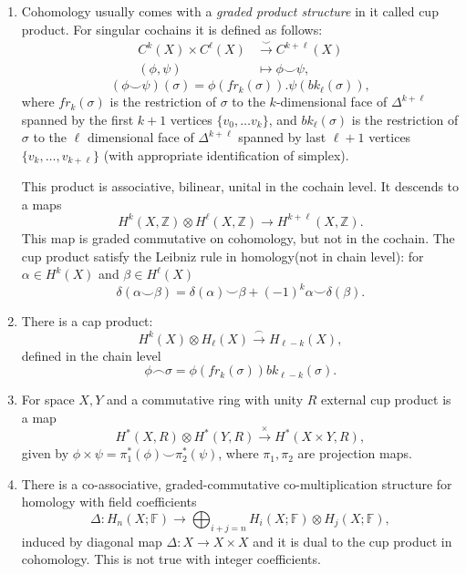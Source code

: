  	\begin{enumerate}
 		\item Cohomology usually comes with a \emph{graded product structure} in it called cup product.
 		For singular cochains it is defined as follows:
 		\begin{align*}
 			C^k(X) \times C^\ell(X) &\xrightarrow{\smile} C^{k + \ell}(X)\\
 			(\phi,\psi) &\mapsto \phi \smile \psi,
 		\end{align*}
 		\[(\phi\smile \psi)(\sigma) = \phi(fr_k(\sigma)).\psi(bk_{\ell}(\sigma)),\]
 		where \(fr_k(\sigma)\) is the restriction of \(\sigma\) to the  \(k\)-dimensional face of \(\Delta^{k +\ell}\) spanned by the first \(k+1\) vertices \(\{v_0, \dots v_k\}\), and \(bk_\ell(\sigma)\) is the restriction of \(\sigma\) to the \(\ell\) dimensional face of \(\Delta^{k+\ell}\) spanned by last \(\ell + 1\) vertices \(\{v_k, \dots, v_{k+\ell}\}\) (with appropriate identification of simplex).
 		
 		This product is associative, bilinear, unital in the cochain level.
 		It descends to a maps
 		\[H^k(X, \mathbb Z) \otimes H^\ell(X, \mathbb Z) \to H^{k + \ell}(X, \mathbb Z).\]
 		This map is graded commutative on cohomology, but not in the cochain.
 		The cup product satisfy the Leibniz rule in homology(not in chain level):
 		for \(\alpha \in H^k(X)\) and \(\beta \in H^\ell (X)\)
 		\[\delta(\alpha \smile \beta) = \delta(\alpha) \smile \beta + (-1)^k \alpha \smile \delta(\beta).\]
 		\item There is a cap product:
 		\[H^k(X) \otimes H_\ell(X) \xrightarrow{\frown} H_{\ell-k}(X),\]
 		defined in the chain level 
 		\[\phi \frown \sigma = \phi(fr_k(\sigma)) bk_{\ell - k}(\sigma).\]
 		
 		\item For space \(X, Y\) and a commutative ring with unity \(R\) external cup product is a map 
 		\[H^\ast(X,R) \otimes H^\ast(Y,R) \xrightarrow{\times} H^\ast(X\times Y , R),\]
 		given by \(\phi \times \psi = \pi_1^\ast(\phi) \smile \pi_2^\ast(\psi)\), where \(\pi_1,\pi_2\) are projection maps.
 		
 		\item There is a co-associative, graded-commutative co-multiplication structure for homology with field coefficients
 		\[\Delta:  H_n(X; \mathbb F) \to \bigoplus_{i+j = n} H_i(X; \mathbb F) \otimes H_j(X; \mathbb F),\]
 		induced by diagonal map \(\Delta : X \to X \times X\) and it is dual to the cup product in cohomology.
 		This is not true with integer coefficients.
 	\end{enumerate}
 	
